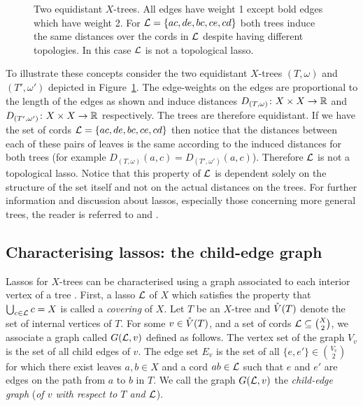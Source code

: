 \begin{figure}
\begin{center}

\end{center}
\caption{Two equidistant $X$-trees.  All edges have weight 1 except bold edges
  which have weight 2.  For ${\mathcal L}=\{ac,de,bc,ce,cd\}$ both trees induce the
  same distances over the cords in ${\mathcal L}$ despite having different topologies.
  In this case ${\mathcal L}$ is not a topological lasso.}
\label{fig:lasso-example}
\end{figure}

To illustrate these concepts consider the two equidistant $X$-trees
$(T,\omega)$ and $(T',\omega')$ depicted in Figure~\ref{fig:lasso-example}.
The edge-weights on the edges are proportional to the length of the edges as
shown and induce distances $D_{(T,\omega)} \colon X \times X \to {\mathbb R}$ and
$D_{(T',\omega')} \colon X \times X \to {\mathbb R}$ respectively.  The trees are
therefore equidistant.  If we have the set of cords ${\mathcal L}=\{ac,de,bc,ce,cd\}$
then notice that the distances between each of these pairs of leaves is the
same according to the induced distances for both trees (for example
$D_{(T,\omega)}(a,c) = D_{(T',\omega')}(a,c)$).  Therefore ${\mathcal L}$ is not a
topological lasso.  Notice that this property of ${\mathcal L}$ is dependent solely on
the structure of the set itself and not on the actual distances on the trees.
For further information and discussion about lassos, especially those
concerning more general trees, the reader is referred to
\cite{dress11lassoing} and \cite{huber2014tree}.

\subsection{Characterising lassos: the child-edge graph}
\label{sec:lassoing-rooted-x}

Lassos for $X$-trees can be characterised using a graph associated to each
interior vertex of a tree \cite{huber13lassoing}.  First, a lasso ${\mathcal L}$ of $X$
which satisfies the property that $\bigcup_{c \in {\mathcal L}} c = X$ is called a
\textit{covering} of $X$.  Let $T$ be an $X$-tree and $\mathring{V}(T)$ denote the set
of internal vertices of $T$.  For some $v \in \mathring{V}(T)$, and a set of cords ${\mathcal L}
\subseteq {X \choose 2}$, we associate a graph called $G({\mathcal L},v)$ defined as
follows.  The vertex set of the graph $V_v$ is the set of all child edges of
$v$.  The edge set $E_v$ is the set of all $\{e,e'\} \in {V_v \choose 2}$ for
which there exist leaves $a,b \in X$ and a cord $ab \in {\mathcal L}$ such that $e$ and
$e'$ are edges on the path from $a$ to $b$ in $T$.  We call the graph
$G({\mathcal L},v)$ the \textit{child-edge graph} (\textit{of $v$ with respect to $T$
  and ${\mathcal L}$}).

